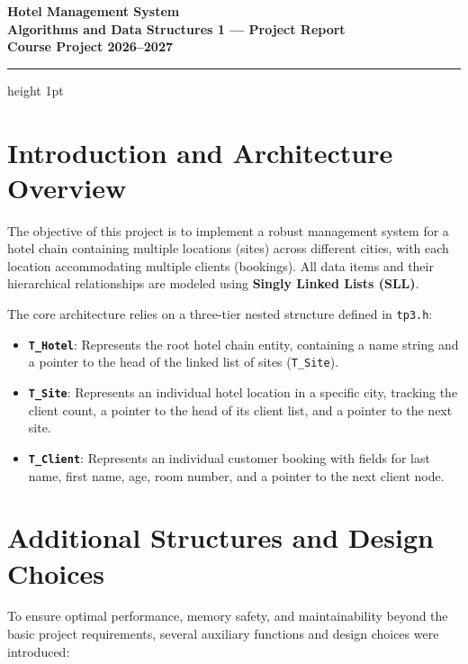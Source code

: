 \documentclass[11pt, a4paper]{article}
\begin{document}
\begin{center}
    {\Huge \textbf{\color{primary} Hotel Management System}}\\[0.6em]
    {\Large \textbf{Algorithms and Data Structures 1 — Project Report}}\\[1em]
    {\large \textbf{Course Project 2026--2027}}
\end{center}

\vspace{0.5cm}
\hrule height 1pt
\vspace{1cm}

\section{Introduction and Architecture Overview}

The objective of this project is to implement a robust management system for a hotel chain containing multiple locations (sites) across different cities, with each location accommodating multiple clients (bookings). All data items and their hierarchical relationships are modeled using \textbf{Singly Linked Lists (SLL)}.

The core architecture relies on a three-tier nested structure defined in \texttt{tp3.h}:
\begin{itemize}
    \item \textbf{\texttt{T\_Hotel}}: Represents the root hotel chain entity, containing a name string and a pointer to the head of the linked list of sites (\texttt{T\_Site}).
    \item \textbf{\texttt{T\_Site}}: Represents an individual hotel location in a specific city, tracking the client count, a pointer to the head of its client list, and a pointer to the next site.
    \item \textbf{\texttt{T\_Client}}: Represents an individual customer booking with fields for last name, first name, age, room number, and a pointer to the next client node.
\end{itemize}

\section{Additional Structures and Design Choices}

To ensure optimal performance, memory safety, and maintainability beyond the basic project requirements, several auxiliary functions and design choices were introduced:
\end{document}
